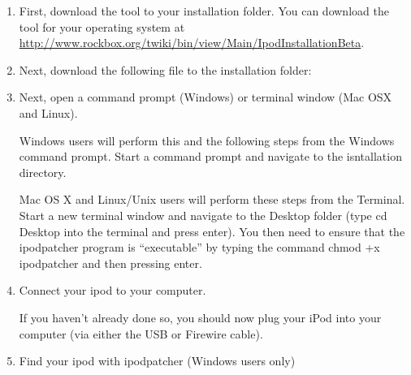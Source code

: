 \begin{enumerate} 

  \item First, download the  tool to your installation 
  folder.  You can download the  tool for your operating 
  system at 
  \url{http://www.rockbox.org/twiki/bin/view/Main/IpodInstallationBeta}.
  
  \item Next, download the following file to the installation folder: 


  \item Next, open a command prompt (Windows) or terminal window (Mac OSX and Linux).
  
    Windows users will perform this and the following steps from the Windows 
    command prompt. Start a command prompt and navigate to the isntallation 
    directory.

    Mac OS X and Linux/Unix users will perform these steps from the Terminal. 
    Start a new terminal window and navigate to the Desktop folder (type cd 
    Desktop into the terminal and press enter). You then need to ensure that the 
    ipodpatcher program is ``executable'' by typing the command chmod +x 
    ipodpatcher and then pressing enter.
  
  \item Connect your ipod to your computer.

    If you haven't already done so, you should now plug your iPod into your 
    computer (via either the USB or Firewire cable).


  \item Find your ipod with ipodpatcher (Windows users only)


\end{enumerate}
